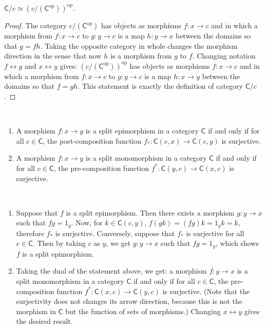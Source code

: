 \begin{prop} $\mathsf{C}/c\simeq (c/(\mathsf{C}^{\mathrm{op}}))^{\mathrm{op}}$.
\end{prop}
\begin{proof} The category $c/(\mathsf{C}^{\mathrm{op}})$ has objects as morphisms $f:x\rightarrow c$ and in which a morphism from $f:x\rightarrow c$ to $g:y\rightarrow c$ is a map $h:y\rightarrow x$ between the domains so that $g=fh$. Taking the opposite category in whole changes the morphism direction in the sense that now $h$ is a morphism from $g$ to $f$. Changing notation $f\leftrightarrow g$ and $x\leftrightarrow y$ gives: $(c/(\mathsf{C}^{\mathrm{op}}))^{\mathrm{op}}$ has objects as morphisms $f:x\rightarrow c$ and in which a morphism from $f:x\rightarrow c$ to $g:y\rightarrow c$ is a map $h:x\rightarrow y$ between the domains so that $f=gh$. This statement is exactly the definition of category $\mathsf{C}/c$.
\end{proof}

\begin{thm}
~\begin{enumerate}
\item A morphism $f:x\rightarrow y$ is a split epimorphism in a category $\mathsf{C}$ if and only if for all $c\in \mathsf{C}$, the post-composition function $f_*:\mathsf{C}(c,x)\rightarrow \mathsf{C}(c,y)$ is surjective.
\item A morphism $f:x\rightarrow y$ is a split monomorphism in a category $\mathsf{C}$ if and only if for all $c\in \mathsf{C}$, the pre-composition function $f^*:\mathsf{C}(y,c)\rightarrow \mathsf{C}(x,c)$ is surjective.
\end{enumerate}
\end{thm}
\begin{solution}
~\begin{enumerate}
\item Suppose that $f$ is a split epimorphism. Then there exists a morphism $g:y\rightarrow x$ such that $fg=1_y$. Now, for $k\in \mathsf{C}(c,y)$, $f(gk)=(fg)k=1_y k=k$, therefore $f_*$ is surjective. Conversely, suppose that $f_*$ is surjective for all $c\in\mathsf{C}$. Then by taking $c$ as $y$, we get $g:y\rightarrow x$ such that $fg=1_y$, which shows $f$ is a split epimorphism.
\item Taking the dual of the statement above, we get: a morphism $f:y\rightarrow x$ is a split monomorphism in a category $\mathsf{C}$ if and only if for all $c\in \mathsf{C}$, the pre-composition function $f^*:\mathsf{C}(x,c)\rightarrow \mathsf{C}(y,c)$ is surjective. (Note that the surjectivity does not changes its arrow direction, because this is not the morphism in $\mathsf{C}$ but the function of sets of morphisms.) Changing $x\leftrightarrow y$ gives the desired result.
\end{enumerate}
\end{solution}

